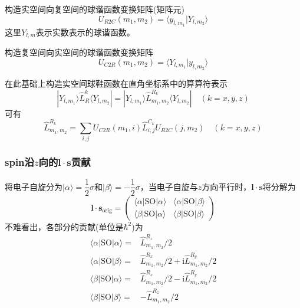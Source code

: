 \documentclass[10pt, oneside, a4paper]{article}      %
\begin{document}
构造实空间向复空间的球谐函数变换矩阵(矩阵元)
\begin{displaymath}
	U_{R2C}(m_1,m_2)=\langle y_{l,m_1}|Y_{l,m_2}\rangle
\end{displaymath}
这里$Y_{l,m}$表示实数表示的球谐函数。

构造复空间向实空间的球谐函数变换矩阵
\begin{displaymath}
	U_{C2R}(m_1,m_2)=\langle Y_{l,m_1}|y_{l,m_2}\rangle
\end{displaymath}

在此基础上构造实空间球鞋函数在直角坐标系中的算算符表示
\begin{displaymath}
	|Y_{l,m_1}\rangle\hat{L}_R^{k}\langle Y_{l,m_2}|=|Y_{l,m_1}\rangle\hat{L}_{m_1,m_2}^{R_k}\langle Y_{l,m_2}| \quad (k=x,y,z)
\end{displaymath}
可有
\begin{displaymath}
	\hat{L}_{m_1,m_2}^{R_k}=\sum_{i,j}U_{C2R}(m_1,i)\hat{L}_{i,j}^{C_k}U_{R2C}(j,m_2) \quad(k=x,y,z)
\end{displaymath}

\subsubsection{\rm{spin}沿$z$向的$\mathbf{l}\cdot\mathbf{s}$贡献}
将电子自旋分为$|\alpha\rangle=\dfrac12\sigma$和$|\beta\rangle=-\dfrac12\sigma$，当电子自旋与$z$方向平行时，$\mathbf{l}\cdot\mathbf{s}$将分解为
\begin{displaymath}
	\mathbf{l}\cdot\mathbf{s}_{\mathrm{orig}}=
	\begin{pmatrix}
		\langle\alpha|\mathrm{SO}|\alpha\rangle &\langle\alpha|\mathrm{SO}|\beta\rangle \\
		\langle\beta|\mathrm{SO}|\alpha\rangle &\langle\beta|\mathrm{SO}|\beta\rangle
	\end{pmatrix}
\end{displaymath}
不难看出，各部分的贡献(单位是$\hbar^2$)为
\begin{displaymath}
	\begin{aligned}
		\langle\alpha|\mathrm{SO}|\alpha\rangle =& \hat{L}_{m_1,m_2}^{R_z}/2\\
		\langle\alpha|\mathrm{SO}|\beta\rangle =& \hat{L}_{m_1,m_2}^{R_x}/2+\mathrm{i}\hat{L}_{m_1,m_2}^{R_y}/2\\
		\langle\beta|\mathrm{SO}|\alpha\rangle =& \hat{L}_{m_1,m_2}^{R_x}/2-\mathrm{i}\hat{L}_{m_1,m_2}^{R_y}/2\\
		\langle\beta|\mathrm{SO}|\beta\rangle =& -\hat{L}_{m_1,m_2}^{R_z}/2
	\end{aligned}
\end{displaymath}
\end{document}
